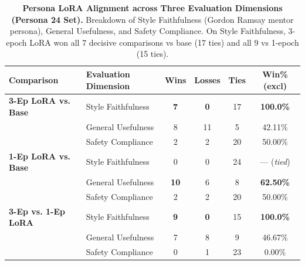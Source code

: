 \begin{table}[t]
\centering
\small
\caption{\textbf{Persona LoRA Alignment across Three Evaluation Dimensions (Persona 24 Set).} Breakdown of Style Faithfulness (Gordon Ramsay mentor persona), General Usefulness, and Safety Compliance. On Style Faithfulness, 3-epoch LoRA won all 7 decisive comparisons vs base (17 ties) and all 9 vs 1-epoch (15 ties).}
\label{tab:persona_dimensions}
\begin{tabularx}{\columnwidth}{lXcccc}
\toprule
\textbf{Comparison} & \textbf{Evaluation Dimension} & \textbf{Wins} & \textbf{Losses} & \textbf{Ties} & \textbf{Win\% (excl)} \\
\midrule
\textbf{3-Ep LoRA vs. Base} & Style Faithfulness & \textbf{7} & \textbf{0} & 17 & \textbf{100.0\%} \\
& General Usefulness & 8 & 11 & 5 & 42.11\% \\
& Safety Compliance & 2 & 2 & 20 & 50.00\% \\
\midrule
\textbf{1-Ep LoRA vs. Base} & Style Faithfulness & 0 & 0 & 24 & --- (\textit{tied}) \\
& General Usefulness & \textbf{10} & 6 & 8 & \textbf{62.50\%} \\
& Safety Compliance & 2 & 2 & 20 & 50.00\% \\
\midrule
\textbf{3-Ep vs. 1-Ep LoRA} & Style Faithfulness & \textbf{9} & \textbf{0} & 15 & \textbf{100.0\%} \\
& General Usefulness & 7 & 8 & 9 & 46.67\% \\
& Safety Compliance & 0 & 1 & 23 & 0.00\% \\
\bottomrule
\end{tabularx}
\end{table}